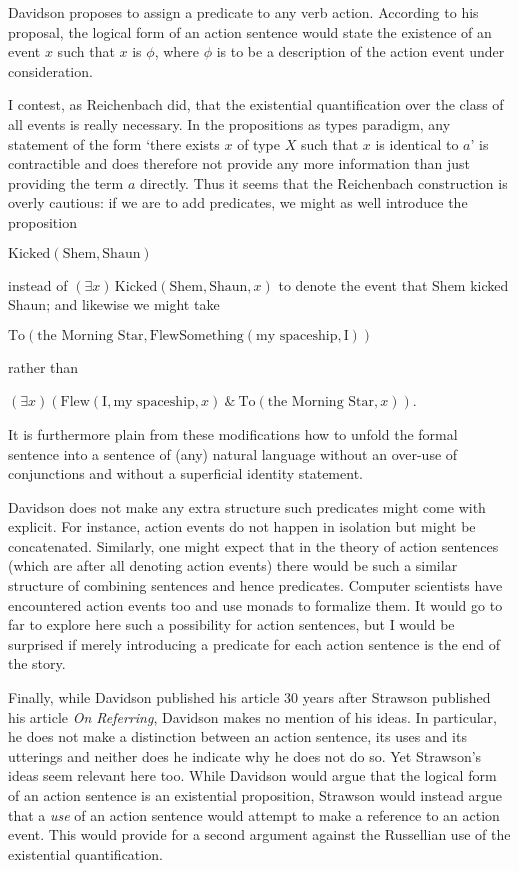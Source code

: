 \documentclass{article}
\begin{document}
Davidson proposes to assign a predicate to any verb action. According to his
proposal, the logical
form of an action sentence would state the existence of an event $x$ such that
$x$ is $\phi$, where $\phi$ is to be a description of the action event under
consideration. 

I contest, as Reichenbach did, that the existential quantification over the class of all events is 
really necessary. In the propositions as types paradigm, any statement of the 
form `there exists $x$ of type $X$ such that $x$ is identical to $a$' is
contractible and does therefore not provide any more information than just 
providing the term $a$ directly. Thus it seems that the Reichenbach construction
is overly cautious: if we are to add predicates, we might as well introduce the
proposition
\begin{center}
$\text{Kicked}(\text{Shem},\text{Shaun})$
\end{center}
instead of $(\exists x)\,\text{Kicked}(\text{Shem},\text{Shaun},x)$ to denote the event that
Shem kicked Shaun; and likewise we might take
\begin{center}
$\text{To}(\text{the Morning Star},
\text{FlewSomething}(\text{my spaceship},\text{I}))$
\end{center}
rather than
\begin{center}
$(\exists x) (\text{Flew}(\text{I},\text{my spaceship},x)\ \&\ \text{To}(\text{the
Morning Star},x))$.
\end{center}
It is furthermore plain from these modifications how to unfold the formal
sentence into a sentence of (any) natural language without an over-use of
conjunctions and without a superficial identity statement.

Davidson does not make any extra structure such predicates might come with 
explicit. For instance, action events do not happen in isolation but might be 
concatenated. Similarly,
one might expect that in the theory of action sentences (which are after all
denoting action events) there would be such a similar structure of combining
sentences and hence predicates. Computer scientists have encountered action 
events too and use monads to formalize them. It would go to far to explore here
such a possibility for action sentences, but I would be surprised if merely
introducing a predicate for each action sentence is the end of the story.

Finally, while Davidson published his article 30 years after Strawson published
his article \emph{On Referring}, Davidson makes no mention of his ideas. In
particular, he does not make a distinction between an action sentence, its uses
and its utterings and neither does he indicate why he does not do so. Yet
Strawson's ideas seem relevant here too. While Davidson would argue that the
logical form of an action sentence is an existential proposition, Strawson would
instead argue that a \emph{use} of an action sentence would attempt to make a
reference to an action event. This would provide for a second argument against
the Russellian use of the existential quantification.
\end{document}
